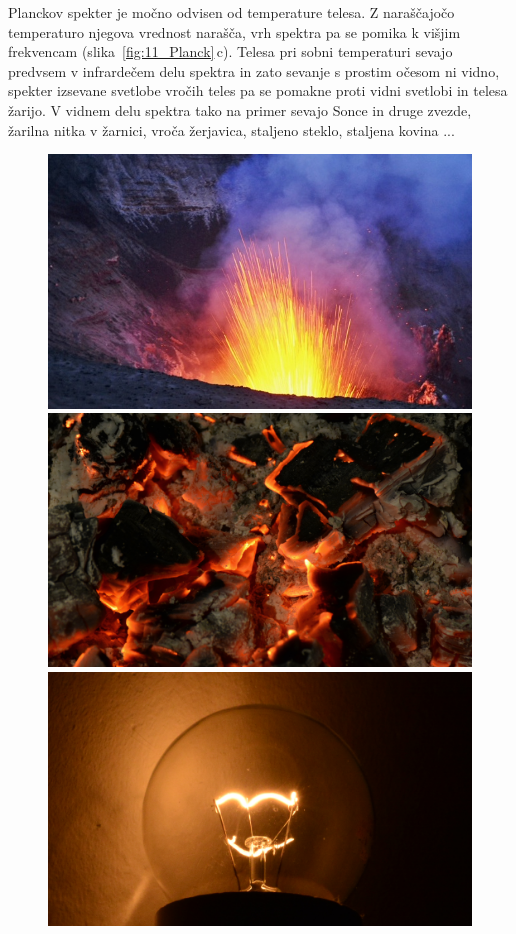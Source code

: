 \begin{remark}
Planckov spekter je močno odvisen od temperature telesa. Z naraščajočo
temperaturo njegova vrednost narašča, vrh spektra pa se pomika k višjim
frekvencam (slika~\ref{fig:11_Planck}\,c). Telesa pri sobni temperaturi
sevajo predvsem v infrardečem delu spektra in zato sevanje s prostim očesom
ni vidno, spekter izsevane svetlobe vročih teles pa se pomakne proti
vidni svetlobi in telesa žarijo. V vidnem delu spektra tako na primer sevajo Sonce in 
druge zvezde, žarilna nitka v žarnici, vroča žerjavica, staljeno steklo, 
staljena kovina ...
\end{remark}
\begin{figure}[ht]
\centering
\includegraphics[width=7truecm]{slike/11_photo_vulkan.jpg}\hfill
\includegraphics[width=7truecm]{slike/11_photo_zerjavica.jpg} \\ 
\includegraphics[width=7truecm]{slike/11_photo_zarnica.jpg}\hfill

\end{figure}
